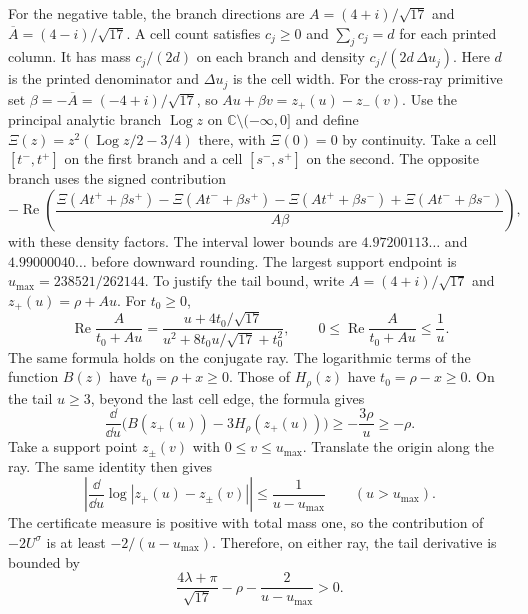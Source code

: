 For the negative table, the branch directions are
$A=(4+i)/\sqrt{17}$ and $\overline A=(4-i)/\sqrt{17}$. A cell count satisfies
$c_j\ge0$ and $\sum_jc_j=d$ for each printed column. It has mass
$c_j/(2d)$ on each branch and density
$c_j/(2d\,\Delta u_j)$. Here $d$ is the printed denominator and
$\Delta u_j$ is the cell width. For the cross-ray primitive set
$\beta=-\overline A=(-4+i)/\sqrt{17}$, so
$Au+\beta v=z_+(u)-z_-(v)$. Use the principal analytic branch
$\operatorname{Log} z$
on $\mathbb C\setminus(-\infty,0]$ and define
$\Xi(z)=z^2(\operatorname{Log} z/2-3/4)$ there, with $\Xi(0)=0$ by continuity. Take a cell
$[t^-,t^+]$ on the first
branch and a cell $[s^-,s^+]$ on the second. The opposite branch uses
the signed contribution
\[
-\operatorname{Re}\!\left(\frac{\Xi(At^++\beta s^+)-\Xi(At^-+\beta s^+)
 -\Xi(At^++\beta s^-)+\Xi(At^-+\beta s^-)}{A\beta}\right),
\]
with these density factors. The interval lower bounds are
$4.97200113\ldots$ and $4.99000040\ldots$ before downward rounding. The
largest support endpoint is $u_{\max}=238521/262144$. To justify the tail
bound, write $A=(4+i)/\sqrt{17}$ and $z_+(u)=\rho+Au$. For $t_0\ge0$,
\[
 \operatorname{Re}\frac{A}{t_0+Au}
 =\frac{u+4t_0/\sqrt{17}}
        {u^2+8t_0 u/\sqrt{17}+t_0^2},
 \qquad 0\le\operatorname{Re}\frac{A}{t_0+Au}\le\frac1u.
\]
The same formula holds on the conjugate ray. The logarithmic terms of the function $B(z)$ have
$t_0=\rho+x\ge0$. Those of $H_\rho(z)$ have $t_0=\rho-x\ge0$. On the tail $u\ge3$, beyond the last cell edge, the
formula gives
\[
 \frac{\dd}{\dd u}\bigl(B(z_+(u))-3H_\rho(z_+(u))\bigr)
 \ge-\frac{3\rho}{u}\ge-\rho.
\]
Take a support point $z_\pm(v)$ with $0\le v\le u_{\max}$. Translate the
origin along the ray. The same identity then gives
\[
 \left|\frac{\dd}{\dd u}\log|z_+(u)-z_\pm(v)|\right|
 \le\frac1{u-u_{\max}}\qquad(u>u_{\max}).
\]
The certificate measure is positive with total mass one, so the contribution of
$-2U^\sigma$ is at least $-2/(u-u_{\max})$. Therefore, on either ray,
the tail derivative is bounded by
\[
 \frac{4\lambda+\pi}{\sqrt{17}}-\rho-\frac{2}{u-u_{\max}}>0.
\]

